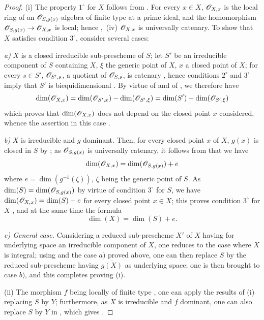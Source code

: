 \begin{proof}
(i) The property $1^\circ$ for $X$ follows from .
For every $x\in X$, $\mathscr{O}_{X,x}$ is the local ring of an $\mathscr{O}_{S,g(x)}$-algebra of finite type at a prime ideal, and the homomorphism $\mathscr{O}_{S,g(x)}\to\mathscr{O}_{X,x}$
is local; hence ,~(iv) $\mathscr{O}_{X,x}$ is universally catenary.
To show that $X$ satisfies condition $3^\circ$, consider several cases:

\emph{a)} $X$ is a closed irreducible sub-prescheme of $S$; let $S'$ be an irreducible component of $S$ containing $X$, $\xi$ the generic point of $X$, $x$ a closed point of $X$; for every $s\in S'$, $\mathscr{O}_{S',s}$, a quotient of $\mathscr{O}_{S,s}$, is catenary , hence conditions $2^\circ$ and $3^\circ$ imply that $S'$ is biequidimensional .
By virtue of  and of , we therefore have
\[
  \dim(\mathscr{O}_{X,x})=\dim(\mathscr{O}_{S',x})-\dim(\mathscr{O}_{S',\xi})=\dim(S')-\dim(\mathscr{O}_{S',\xi})
\]
which proves that $\dim(\mathscr{O}_{X,x})$ does not depend on the closed point $x$ considered, whence the assertion in this case .

\emph{b)} $X$ is irreducible and $g$ dominant.
Then, for every closed point $x$ of $X$, $g(x)$ is closed in $S$ by ; as $\mathscr{O}_{S,g(x)}$ is universally catenary, it follows from  that we have
\[
  \dim(\mathscr{O}_{X,x})=\dim(\mathscr{O}_{S,g(x)})+e
\]
where $e=\dim(g^{-1}(\zeta))$, $\zeta$ being the generic point of $S$.
As $\dim(S)=\dim(\mathscr{O}_{S,g(x)})$ by virtue of condition $3^\circ$ for $S$, we have $\dim(\mathscr{O}_{X,x})=\dim(S)+e$ for every closed point $x\in X$; this proves condition $3^\circ$ for $X$ , and at the same time the formula
\begin{equation}
\label{IV.10.6.1.4}
\tag{10.6.1.4}
\dim(X)=\dim(S)+e.
\end{equation}

\emph{c) General case.}
Considering a reduced sub-prescheme $X'$ of $X$ having for underlying space an irreducible component of $X$, one reduces to the case where $X$ is integral; using  and the case $a)$ proved above, one can then replace $S$ by the reduced sub-prescheme having $\overline{g(X)}$ as underlying space; one is then brought to case $b)$, and this completes proving (i).

(ii) The morphism $f$ being locally of finite type , one can apply the results of (i) replacing $S$ by $Y$; furthermore, as $X$ is irreducible and $f$ dominant, one can also replace $S$ by $Y$ in , which gives .


\end{proof}
